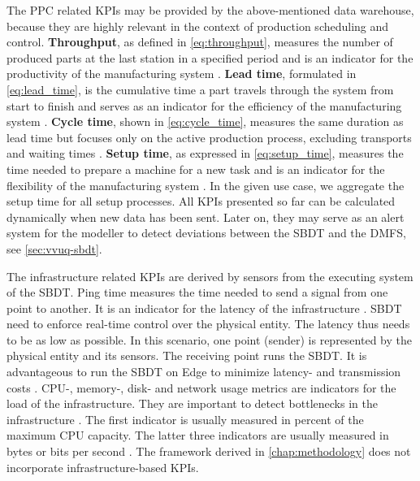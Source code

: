 The PPC related KPIs may be provided by the above-mentioned data warehouse, because they are highly relevant in the context of production scheduling and control. \textbf{Throughput}, as defined in \autoref{eq:throughput}, measures the number of produced parts at the last station in a specified period and is an indicator for the productivity of the manufacturing system \cite{hopp2011factory, imseitif2019throughput}. \textbf{Lead time}, formulated in \autoref{eq:lead_time}, is the cumulative time a part travels through the system from start to finish and serves as an indicator for the efficiency of the manufacturing system \cite{slack2010operations, pfeiffer2016manufacturing}. \textbf{Cycle time}, shown in \autoref{eq:cycle_time}, measures the same duration as lead time but focuses only on the active production process, excluding transports and waiting times \cite{goldratt2004goal, griffin1993metrics}. \textbf{Setup time}, as expressed in \autoref{eq:setup_time}, measures the time needed to prepare a machine for a new task and is an indicator for the flexibility of the manufacturing system \cite{allahverdi1999review, allahverdi2008significance}. In the given use case, we aggregate the setup time for all setup processes. All KPIs presented so far can be calculated dynamically when new data has been sent. Later on, they may serve as an alert system for the modeller to detect deviations between the SBDT and the DMFS, see \autoref{sec:vvuq-sbdt}.

The infrastructure related KPIs are derived by sensors from the executing system of the SBDT. Ping time measures the time needed to send a signal from one point to another. It is an indicator for the latency of the infrastructure \autocite{wu2021digital}. SBDT need to enforce real-time control over the physical entity. The latency thus needs to be as low as possible. In this scenario, one point (sender) is represented by the physical entity and its sensors. The receiving point runs the SBDT. It is advantageous to run the SBDT on Edge to minimize latency- and transmission costs \autocite{li2018learning}. CPU-, memory-, disk- and network usage metrics are indicators for the load of the infrastructure. They are important to detect bottlenecks in the infrastructure \autocite{li2018learning}. The first indicator is usually measured in percent of the maximum CPU capacity. The latter three indicators are usually measured in bytes or bits per second \autocite{granelli2021evaluating}. The framework derived in \autoref{chap:methodology} does not incorporate infrastructure-based KPIs.


